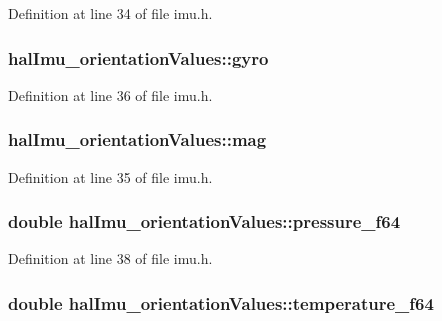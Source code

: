Definition at line 34 of file imu.\+h.

\hypertarget{structhalImu__orientationValues_a386a3509066dbfd830da6b7a993b31da_a386a3509066dbfd830da6b7a993b31da}{
\subsubsection[{gyro}]{ hal\+Imu\+\_\+orientation\+Values\+::gyro}}\label{structhalImu__orientationValues_a386a3509066dbfd830da6b7a993b31da_a386a3509066dbfd830da6b7a993b31da}


Definition at line 36 of file imu.\+h.

\hypertarget{structhalImu__orientationValues_ac0763bc025ee3aa20f167e74ecccfc3c_ac0763bc025ee3aa20f167e74ecccfc3c}{
\subsubsection[{mag}]{ hal\+Imu\+\_\+orientation\+Values\+::mag}}\label{structhalImu__orientationValues_ac0763bc025ee3aa20f167e74ecccfc3c_ac0763bc025ee3aa20f167e74ecccfc3c}


Definition at line 35 of file imu.\+h.

\hypertarget{structhalImu__orientationValues_a512925b63aa63c02874ce4dbb920c7f0_a512925b63aa63c02874ce4dbb920c7f0}{
\subsubsection[{pressure\+\_\+f64}]{\setlength{\rightskip}{0pt plus 5cm}double hal\+Imu\+\_\+orientation\+Values\+::pressure\+\_\+f64}}\label{structhalImu__orientationValues_a512925b63aa63c02874ce4dbb920c7f0_a512925b63aa63c02874ce4dbb920c7f0}


Definition at line 38 of file imu.\+h.

\hypertarget{structhalImu__orientationValues_aeda72e72e4979977023cba31ee89cffa_aeda72e72e4979977023cba31ee89cffa}{
\subsubsection[{temperature\+\_\+f64}]{\setlength{\rightskip}{0pt plus 5cm}double hal\+Imu\+\_\+orientation\+Values\+::temperature\+\_\+f64}}\label{structhalImu__orientationValues_aeda72e72e4979977023cba31ee89cffa_aeda72e72e4979977023cba31ee89cffa}


